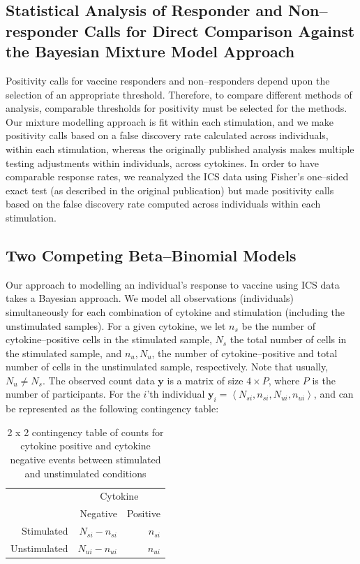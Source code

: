 \documentclass[11pt]{article}
\begin{document}
\subsection*{Statistical Analysis of Responder and Non--responder Calls for Direct Comparison Against the Bayesian Mixture Model Approach}
Positivity calls for vaccine responders and non--responders depend upon the selection of an appropriate threshold. Therefore, to compare different methods of analysis, comparable thresholds for positivity must be selected for the methods. Our mixture modelling approach is fit within each stimulation, and we make positivity calls based on a false discovery rate calculated across individuals, within each stimulation, whereas the originally published analysis makes multiple testing adjustments within individuals, across cytokines. In order to have comparable response rates, we reanalyzed the ICS data using Fisher's one--sided exact test (as described in the original publication) but made positivity calls based on the false discovery rate computed across individuals within each stimulation.

\subsection*{Two Competing Beta--Binomial Models}
Our approach to modelling an individual's response to vaccine using ICS data takes a Bayesian approach. We model all observations (individuals) simultaneously for each combination of cytokine and stimulation (including the unstimulated samples). For a given cytokine, we let $n_s$ be the number of cytokine--positive cells in the stimulated sample, $N_s$ the total number of cells in the stimulated sample, and $n_u, N_u$, the number of cytokine--positive and total number of cells in the unstimulated sample, respectively. Note that usually, $N_u \ne N_s$. The observed count data $\mathbf{y}$ is a matrix of size $4 \times P$, where $P$ is the number of participants. For the $i$'th individual $\mathbf{y}_i = \left<N_{si},n_{si},N_{ui},n_{ui}\right>$, and can be represented as the following contingency table: 
\begin{table}[ht]
\centering
\parbox{0.8\linewidth}{
\caption{2 x 2 contingency table of counts for cytokine positive and cytokine negative events between stimulated and unstimulated conditions}\label{tab:twobytwo}
\centering
\begin{tabular}{rrr}

  \hline
\multicolumn{1}{l}{}&
\multicolumn{2}{c}{Cytokine}\\
 & Negative & Positive \\ 
  \hline
Stimulated &   $N_{si} - n_{si}$ &   $n_{si}$ \\ 
Unstimulated &   $N_{ui}-n_{ui}$ &   $n_{ui}$ \\ 
   \hline
\end{tabular}
}
\end{table}
\end{document}
